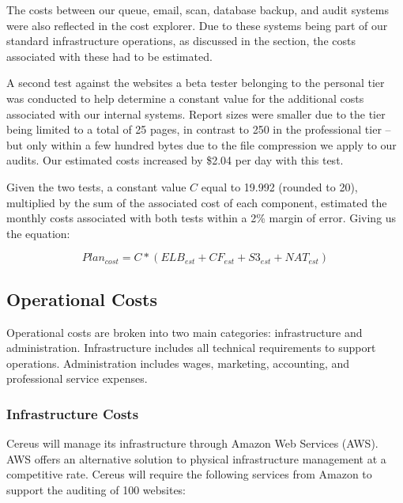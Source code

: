 The costs between our queue, email, scan, database backup, and audit systems were also reflected in the cost explorer. Due to these systems being part of our standard infrastructure operations, as discussed in the  section, the costs associated with these had to be estimated.

A second test against the websites a beta tester belonging to the personal tier was conducted to help determine a constant value for the additional costs associated with our internal systems. Report sizes were smaller due to the tier being limited to a total of 25 pages, in contrast to 250 in the professional tier -- but only within a few hundred bytes due to the file compression we apply to our audits. Our estimated costs increased by \$2.04 per day with this test.

Given the two tests, a constant value \(C\) equal to 19.992 (rounded to 20), multiplied by the sum of the associated cost of each component, estimated the monthly costs associated with both tests within a 2\% margin of error. Giving us the equation:

\[
  Plan_{cost} = C * (ELB_{est} + CF_{est} + S3_{est} + NAT_{est})
\]


\subsection{Operational Costs} \label{section.operational.costs}

Operational costs are broken into two main categories: infrastructure and administration. Infrastructure includes all technical requirements to support operations. Administration includes wages, marketing, accounting, and professional service expenses.

\subsubsection{Infrastructure Costs} \label{infra.costs}

Cereus will manage its infrastructure through Amazon Web Services (AWS). AWS offers an alternative solution to physical infrastructure management at a competitive rate. Cereus will require the following services from Amazon to support the auditing of 100 websites:

